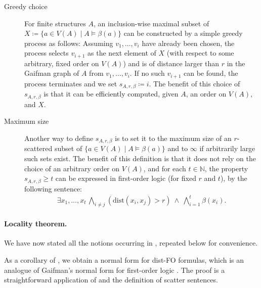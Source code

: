 \documentclass[11pt]{article}
\theoremstyle{remark}
\def\N{\mathbb N}
\renewcommand{\ge}{\geqslant}
\newcommand{\dist}{\mathrm{dist}}
\newcommand{\distFO}{\textrm{\upshape dist-FO}\xspace}
\begin{document}
\begin{description}
    \item[Greedy choice]
    For finite structures $A$, an inclusion-wise maximal subset of \(X\coloneqq\{ a \in V(A) \mid A \models \beta(a)\}\) can be constructed by a simple greedy process as follows:
Assuming \(v_1,\dots,v_i\) have already been chosen, the process selects \(v_{i+1}\) as the next element of $X$ (with respect to some arbitrary, fixed order on \(V(A)\))
 and is of distance larger than \(r\) in the Gaifman graph of $A$ from \(v_1,\dots,v_i\).
If no such \(v_{i+1}\) can be found, the process terminates and we set $s_{A,r,\beta} \coloneqq i$.
The benefit of this choice of $s_{A,r,\beta}$ is that it can be efficiently computed, given $A$, an order on $V(A)$, and $X$.
    \item[Maximum size] 
     Another way to define \(s_{A,r,\beta}\) is to set it to the maximum size of an \(r\)-scattered subset of \(\{ a \in V(A) \mid A \models \beta(a)\}\) and to $\infty$ if arbitrarily large such sets exist. The benefit of this definition is that it does not rely on the choice of an arbitrary order on $V(A)$, and for each $t\in\N$, the  property $s_{A,r,\beta}\ge t$ can be expressed in first-order logic (for fixed $r$ and $t$), by the following sentence: 
     \begin{align}\label{eq:scatt-sent}
        \exists x_1,\ldots,x_t\,
\bigwedge_{i\neq j}\left(\dist(x_i,x_j)>r\right)
\ \land\
\bigwedge_{i=1}^t \beta(x_i).
     \end{align}


\end{description}


\paragraph{Locality theorem.}
We have now stated all the notions occurring in , repeated below for convenience.
\localglobalgame*

As a corollary of , we obtain a normal form for \distFO formulas, which is an analogue of Gaifman's normal form for first-order logic \cite{gaifman}. 
The proof is a straightforward application of \Cref{thm:localglobal} and the definition of scatter sentences.
\end{document}
